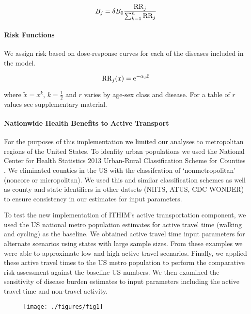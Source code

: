 \documentclass[10pt,letterpaper]{article}\usepackage[]{graphicx}\usepackage[]{color}
\begin{document}
\begin{equation}
B_j = \delta B_0\frac{\mathrm{RR}_j}{\sum_{k=1}^n \mathrm{RR}_j}\label{burden}
\end{equation}

\paragraph{Risk Functions}

We assign risk based on dose-response curves for each of the diseases
included in the model.

\begin{equation}
\mathrm{RR}_j(x) = \mathrm{e}^{-\alpha_j \tilde{x}}
\end{equation}

where $\tilde{x} = x^k$, $k=\frac{1}{2}$ and $r$ varies by age-sex
class and disease.  For a table of $r$ values see supplementary
material.

\paragraph{Nationwide Health Benefits to Active Transport}

For the purposes of this implementation we limited our analyses to
metropolitan regions of the United States. To idenfity urban
populations we used the National Center for Health Statistics 2013
Urban-Rural Classification Scheme for Counties \cite{ingram2014}. We
eliminated counties in the US with the classifcation of
`nonmetropolitan' (noncore or micropolitan). We used this and similar
classification schemes as well as county and state identifiers in
other datsets (NHTS, ATUS, CDC WONDER) to ensure consistency in our
estimates for input parameters.

To test the new implementation of ITHIM's active transportation
component, we used the US national metro population estimates for
active travel time (walking and cycling) as the baseline. We obtained
active travel time input parameters for alternate scenarios using
states with large sample sizes. From these examples we were able to
approximate low and high active travel scenarios. Finally, we applied
these active travel times to the US metro population to perform the
comparative risk assessment against the baseline US numbers. We then
examined the sensitivity of disease burden estimates to input
parameters including the active travel time and non-travel activity.

\begin{figure}[t]
  \centerline{\texttt{[image: ./figures/fig1]}}
    \caption{}\label{fig1}
\end{figure}
\end{document}
